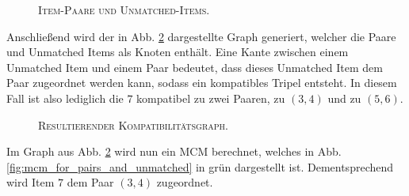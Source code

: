\begin{figure}[H]
\centering
{}
\caption{\textsc{Item-Paare und Unmatched-Items.}}
\label{fig:pairs_and_unmatched}
\end{figure}

Anschließend wird der in Abb. \ref{fig:graph_for_pairs_and_unmatched} dargestellte Graph generiert, welcher die Paare und
Unmatched Items als Knoten enthält. Eine Kante zwischen einem Unmatched Item und einem Paar bedeutet, dass dieses Unmatched
Item dem Paar zugeordnet werden kann, sodass ein kompatibles Tripel entsteht.
In diesem Fall ist also lediglich die $7$ kompatibel zu zwei Paaren, zu $(3, 4)$ und zu $(5, 6)$.

\begin{figure}[H]
\centering
{}
\caption{\textsc{Resultierender Kompatibilitätsgraph.}}
\label{fig:graph_for_pairs_and_unmatched}
\end{figure}

Im Graph aus Abb. \ref{fig:graph_for_pairs_and_unmatched} wird nun ein \textsc{MCM} berechnet, welches
in Abb. \ref{fig:mcm_for_pairs_and_unmatched} in grün dargestellt ist.
Dementsprechend wird Item $7$ dem Paar $(3, 4)$ zugeordnet.

